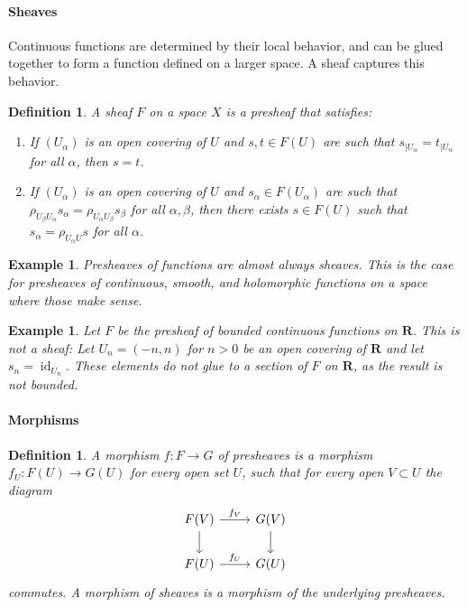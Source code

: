 \documentclass[10pt,a4paper]{article}
\newtheorem{defi}[theo]{Definition}
\newtheorem{exam}[theo]{Example}
\newcommand{\sh}[1]{#1}
\def\RR{\mathbf{R}}
\DeclareMathOperator{\id}{id}
\begin{document}
\paragraph{Sheaves}

Continuous functions are determined by their local behavior, and can be glued
together to form a function defined on a larger space.
A sheaf captures this behavior.


\begin{defi}
A \emph{sheaf} $\sh{F}$ on a space $X$ is a presheaf that satisfies:
\begin{enumerate}
\item
If $(U_\alpha)$ is an open covering of $U$ and $s, t \in \sh{F}(U)$ are such that
$s_{|U_\alpha} = t_{|U_\alpha}$ for all $\alpha$, then $s = t$.

\item
If $(U_\alpha)$ is an open covering of $U$ and $s_\alpha \in \sh{F}(U_\alpha)$
are such that $\rho_{U_\beta U_\alpha}s_{\alpha} = \rho_{U_\alpha U_\beta}
s_\beta$ for all $\alpha,\beta$, then there exists $s \in \sh{F}(U)$ such that
$s_\alpha = \rho_{U_\alpha U} s$ for all $\alpha$.
\end{enumerate}
\end{defi}


\begin{exam}
Presheaves of functions are almost always sheaves.
This is the case for presheaves of continuous, smooth, and holomorphic
functions on a space where those make sense.
\end{exam}

\begin{exam}
Let $\sh{F}$ be the presheaf of bounded continuous functions on $\RR$.
This is not a sheaf:
Let $U_n = (-n, n)$ for $n > 0$ be an open covering of $\RR$ and let
$s_n = \id_{U_n}$.
These elements do not glue to a section of $\sh{F}$ on $\RR$, as the result is
not bounded.
\end{exam}


\paragraph{Morphisms}

\begin{defi}
A morphism $f : \sh{F} \to \sh{G}$ of presheaves is
a morphism $f_U : \sh{F}(U) \to \sh{G}(U)$
for every open set $U$, such that
for every open $V \subset U$ the diagram
$$
\begin{tikzcd}
\sh{F}(V) \ar[d] \ar[r,"f_V"] & \sh{G}(V) \ar[d]
\\
\sh{F}(U) \ar[r,"f_U"] & \sh{G}(U)
\end{tikzcd}
$$
commutes.
A morphism of sheaves is a morphism of the underlying presheaves.
\end{defi}
\end{document}
